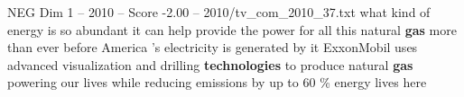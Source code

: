 \begin{textsample}{NEG Dim 1 – 2010 – Score -2.00 – 2010/tv\_com\_2010\_37.txt}  \label{ex:f1_neg_033}
what kind of energy is so abundant it can help provide the power for all this natural \textbf{gas} more than ever before America 's electricity is generated by it ExxonMobil uses advanced visualization and drilling \textbf{technologies} to produce natural \textbf{gas} powering our lives while reducing emissions by up to 60 \% energy lives here

\end{textsample}
